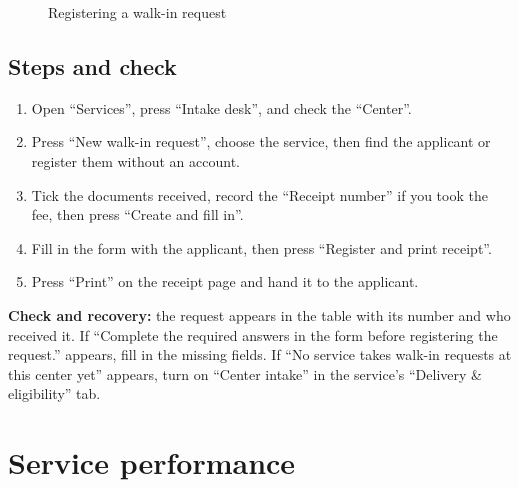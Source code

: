 \begin{figure}[H]
\centering
{}
\rclegend
\caption{Registering a walk-in request}
\label{fig:builder-services-intake-flow}
\end{figure}

\subsection{Steps and check}
\begin{enumerate}
\item Open “Services”, press “Intake desk”, and check the “Center”.
\item Press “New walk-in request”, choose the service, then find the applicant or register them without an account.
\item Tick the documents received, record the “Receipt number” if you took the fee, then press “Create and fill in”.
\item Fill in the form with the applicant, then press “Register and print receipt”.
\item Press “Print” on the receipt page and hand it to the applicant.
\end{enumerate}

\textbf{Check and recovery:} the request appears in the table with its number and who received it. If “Complete the required answers in the form before registering the request.” appears, fill in the missing fields. If “No service takes walk-in requests at this center yet” appears, turn on “Center intake” in the service's “Delivery \& eligibility” tab.

\clearpage
\section{Service performance}
\label{sec:builder-feature-services-performance}

